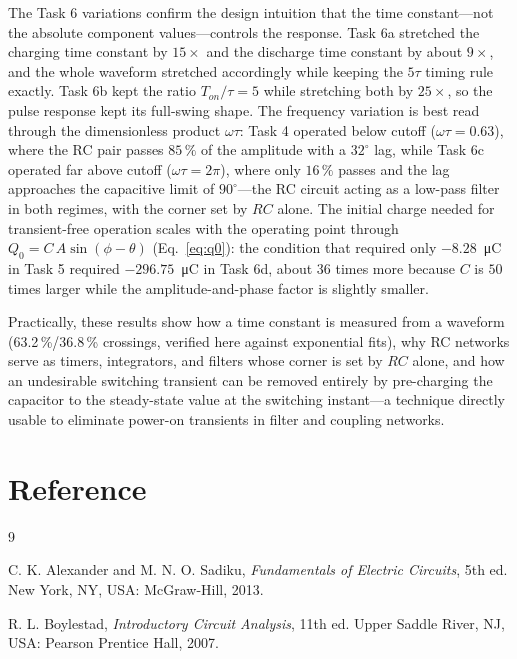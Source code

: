 \documentclass[12pt,a4paper]{article}
\begin{document}
	The Task 6 variations confirm the design intuition that the time
	constant---not the absolute component values---controls the
	response.  Task 6a stretched the charging time constant by
	$15\times$ and the discharge time constant by about $9\times$, and
	the whole waveform stretched accordingly while keeping the $5\tau$
	timing rule exactly.  Task 6b kept the ratio $T_{on}/\tau = 5$ while
	stretching both by $25\times$, so the pulse response kept its
	full-swing shape.  The frequency variation is best read through the
	dimensionless product $\omega\tau$: Task 4 operated below cutoff
	($\omega\tau = 0.63$), where the RC pair passes $85\,\%$ of the
	amplitude with a $32^\circ$ lag, while Task 6c operated far above
	cutoff ($\omega\tau = 2\pi$), where only $16\,\%$ passes and the lag
	approaches the capacitive limit of $90^\circ$---the RC circuit
	acting as a low-pass filter in both regimes, with the corner set by
	$RC$ alone.  The initial charge needed for transient-free operation
	scales with the operating point through
	$Q_0 = C\,A\sin(\phi - \theta)$ (Eq.~\eqref{eq:q0}): the condition
	that required only $-8.28$~\si{\micro\coulomb} in Task 5 required
	$-296.75$~\si{\micro\coulomb} in Task 6d, about $36$ times more
	because $C$ is $50$ times larger while the amplitude-and-phase
	factor is slightly smaller.
	
	Practically, these results show how a time constant is measured
	from a waveform (63.2\,\%/36.8\,\% crossings, verified here against
	exponential fits), why RC networks serve as timers, integrators,
	and filters whose corner is set by $RC$ alone, and how an
	undesirable switching transient can be removed entirely by
	pre-charging the capacitor to the steady-state value at the
	switching instant---a technique directly usable to eliminate
	power-on transients in filter and coupling networks.
	
	\section{Reference}
	\begin{thebibliography}{9}
		\itemsep4pt
		
		C. K. Alexander and M. N. O. Sadiku, \textit{Fundamentals of
			Electric Circuits}, 5th ed. New York, NY, USA: McGraw-Hill, 2013.
		
		R. L. Boylestad, \textit{Introductory Circuit Analysis}, 11th ed.
		Upper Saddle River, NJ, USA: Pearson Prentice Hall, 2007.
		
		
	\end{thebibliography}
	
\end{document}
